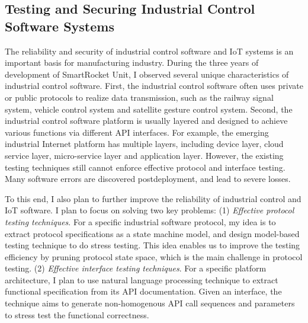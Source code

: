 \documentclass[a4paper]{article}
\begin{document}
\subsection{Testing and Securing Industrial Control Software Systems}

The reliability and security of industrial control software and IoT systems
is an important basis for manufacturing industry. 
During the three years of development of SmartRocket Unit, I observed several unique characteristics of industrial control software. 
First, the industrial control software often uses private or public protocols to realize data transmission, such as the railway signal system, vehicle control system and satellite gesture control system. 
Second, the industrial control software platform is usually layered and 
designed to achieve various functions via different API interfaces.
For example, the emerging industrial Internet platform has multiple layers, including device layer, cloud service layer, micro-service layer and application layer. 
However, the existing testing techniques still cannot enforce 
effective protocol and interface testing. 
Many software errors are discovered postdeployment, and lead to severe losses. 

To this end, I also plan to further improve the reliability of 
industrial control and IoT software. I plan to focus on solving two key problems: 
(1) \emph{Effective protocol testing techniques}. 
For a specific industrial software protocol, my idea is to extract protocol specifications as a state machine model, and design model-based testing technique to do stress testing. 
This idea enables us to improve the testing efficiency by pruning protocol state space,
which is the main challenge in protocol testing.
(2) \emph{Effective interface testing techniques}.
For a specific platform architecture, I plan to use natural language processing technique to extract functional specification from its API documentation. 
Given an interface, the technique aims to generate non-homogenous API call sequences and parameters to stress test the functional correctness.
\end{document}

